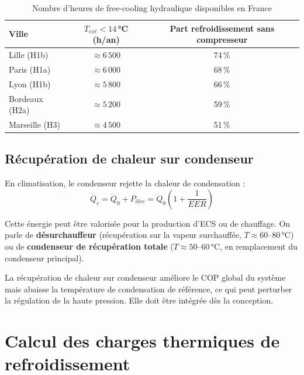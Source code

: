 \begin{table}[H]
  \centering
  \caption{Nombre d'heures de free-cooling hydraulique disponibles en France}
  \begin{tabular}{lcc}
    \toprule
    Ville & $T_{ext} < 14$\,°C (h/an) & Part refroidissement sans compresseur \\
    \midrule
    Lille (H1b) & $\approx 6\,500$ & 74\,\% \\
    Paris (H1a) & $\approx 6\,000$ & 68\,\% \\
    Lyon (H1b) & $\approx 5\,800$ & 66\,\% \\
    Bordeaux (H2a) & $\approx 5\,200$ & 59\,\% \\
    Marseille (H3) & $\approx 4\,500$ & 51\,\% \\
    \bottomrule
  \end{tabular}
\end{table}

\subsection{Récupération de chaleur sur condenseur}

En climatisation, le condenseur rejette la chaleur de condensation :
\[
  \dot{Q}_c = \dot{Q}_0 + P_{élec} = \dot{Q}_0 \left(1 + \frac{1}{EER}\right)
\]

Cette énergie peut être valorisée pour la production d'ECS ou de chauffage. On parle de \textbf{désurchauffeur} (récupération sur la vapeur surchauffée, $T \approx 60$--80\,°C) ou de \textbf{condenseur de récupération totale} ($T \approx 50$--60\,°C, en remplacement du condenseur principal).

\begin{attention}
La récupération de chaleur sur condenseur améliore le COP global du système mais abaisse la température de condensation de référence, ce qui peut perturber la régulation de la haute pression. Elle doit être intégrée dès la conception.
\end{attention}

\section{Calcul des charges thermiques de refroidissement}

